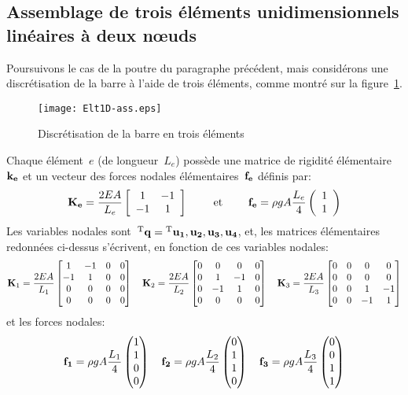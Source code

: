 \medskip
\subsection{Assemblage de trois éléments unidimensionnels linéaires à deux nœuds}\label{Sec-ass}

Poursuivons le cas de la poutre du paragraphe précédent, mais considérons une discrétisation de la barre à l'aide de trois éléments, comme montré sur la figure~\ref{fig-ex2ass}.
\begin{figure}[h!]\centering
\texttt{[image: Elt1D-ass.eps]}
\caption{Discrétisation de la barre en trois éléments}\label{fig-ex2ass}
\end{figure}
\medskipvm
Chaque élément~$e$ (de longueur~$L_e$) possède une matrice de rigidité élémentaire~$\MM{k_e}$ et un vecteur des forces nodales élémentaires~$\VV{f_e}$ définis par:
\begin{equation}
\MM{K_e} = \frac{2EA}{L_e} \MM*{\begin{array}{cc} 1 & -1\\ -1& 1 \end{array}}
\qquad \text{ et } \qquad
\VV{f_e} = \rho g A \frac{L_e}4 \VV*{\begin{array}{c} 1 \\1 \end{array}}
\end{equation}
\medskipvm
Les variables nodales sont~${}^\mathrm{T}\mathbf{q}={}^\mathrm{T}\mathbf{u_1, u_2, u_3, u_4}$, et, les matrices élémentaires
redonnées ci-dessus s'écrivent, en fonction de ces variables nodales:
\begin{equation*}
\MM{K}_1 = \frac{2EA}{L_1} \MM*{1 & -1 & 0 & 0\\ -1& 1 & 0 & 0\\ 0&0&0&0\\0&0&0&0}
\quad
\MM{K}_2 = \frac{2EA}{L_2} \MM*{0&0&0&0\\ 0& 1 & -1 & 0\\ 0 & -1& 1& 0\\0&0&0&0}
\quad
\MM{K}_3 = \frac{2EA}{L_3} \MM*{0&0&0&0\\0&0&0&0\\0& 0& 1 & -1\\ 0&0 & -1& 1}
\end{equation*}
et les forces nodales:
\begin{equation*}
\VV{f_1} = \rho g A \frac{L_1}4 \VV*{1 \\1\\0\\0}
\quad
\VV{f_2} = \rho g A \frac{L_2}4 \VV*{0\\1 \\1\\0}
\quad
\VV{f_3} = \rho g A \frac{L_3}4 \VV*{0\\0\\1 \\1}
\end{equation*}
